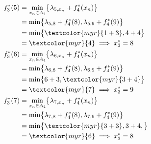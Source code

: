 \documentclass{report}
\begin{document}
\begin{multicols*}{2}
\begin{tikzpicture}[scale=0.85, 
    ->,>=stealth',shorten >=1pt,auto,node distance=2cm,
    thick,main node/.style={circle,draw}
]
\end{tikzpicture}

\begin{align*}
    f^{*}_3(5)  &= \min_{x_n \in A_{4}}\bigl\{ \lambda_{5, x_n} 
    + f_4^{*}(x_n) \bigr\}
    \\ 
                &= 
                \min\bigl\{ 
                \lambda_{5, 8} + f_4^{*}(8), 
                \lambda_{5, 9} + f_4^{*}(9)
                \bigr\} 
                \\
                &= 
                \min\bigl\{
                \textcolor{myr}{1 + 3},
                4 + 4           
                \bigr\}
                \\
                &= \textcolor{myr}{4} 
                \implies x_3^{*} = 8 
    \\
    f^{*}_3(6)  &= \min_{x_n \in A_{4}}\bigl\{ \lambda_{6, x_n} 
    + f_4^{*}(x_n) \bigr\}
    \\ 
                &= 
                \min\bigl\{ 
                \lambda_{6, 8} + f_4^{*}(8), 
                \lambda_{6, 9} + f_4^{*}(9)
                \bigr\} 
                \\
                &= 
                \min\bigl\{
                6 + 3,
                \textcolor{myr}{3 + 4}  
                \bigr\}
                \\
                &= \textcolor{myr}{7} 
                \implies x_3^{*} = 9 
\\
    f^{*}_3(7)  &= \min_{x_n \in A_{4}}\bigl\{ \lambda_{7, x_n} 
    + f_4^{*}(x_n) \bigr\}
    \\ 
                &= 
                \min\bigl\{ 
                \lambda_{7, 8} + f_4^{*}(8), 
                \lambda_{7, 9} + f_4^{*}(9)
                \bigr\} 
                \\
                &= 
                \min\bigl\{
                \textcolor{myr}{3 + 3},   
                3 + 4,
                \bigr\}
                \\
                &= \textcolor{myr}{6} 
                \implies x_3^{*} = 8 
\end{align*}


\end{multicols*}
\end{document}
